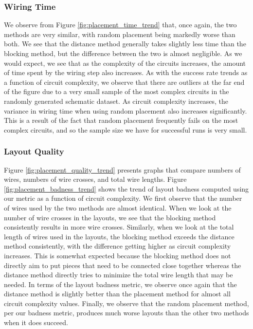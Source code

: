 \subsubsection{Wiring Time}
We observe from
Figure \ref{fig:placement_time_trend} that, once again, the two methods are
very similar, with random placement being markedly worse than both.
We see that the distance method generally takes slightly less
time than the blocking method, but the difference between the two is
almost negligible. As we would expect, we see that as the complexity
of the circuits increases, the amount of time spent by the wiring step also
increases. As with the success rate trends as a function of circuit
complexity, we observe that there are outliers at the far end of the figure due
to a very small sample of the most complex circuits in the randomly generated
schematic dataset. As circuit complexity increases, the variance in wiring time
when using random placement also increases significantly. This is a result of
the fact that random placement frequently fails on the most complex
circuits, and so the sample size we have for successful runs is very small.

\subsubsection{Layout Quality}
Figure
\ref{fig:placement_quality_trend} presents graphs that compare numbers of wires,
numbers of wire crosses, and total wire lengths.
Figure \ref{fig:placement_badness_trend} shows the trend of layout badness
computed using our metric as a function of circuit complexity.
We first observe that the
number of wires used by the two methods are almost identical. When
we look at the number of wire crosses in the layouts, we
see that the blocking method consistently results in more wire crosses.
Similarly,
when we look at the total length of wires used in the layouts, the blocking
method exceeds the distance method consistently, with the difference getting
higher as circuit complexity increases.
This is somewhat expected because the blocking method does not directly aim to
put pieces that need to be connected close together whereas the distance method
directly tries to minimize the total wire length that may be needed. In terms
of the layout badness metric, we observe once again that the distance method
is slightly better than the placement method for almost all circuit complexity
values. Finally, we observe that the random
placement method, per our badness metric, produces much worse layouts than the
other two methods when it does succeed.

